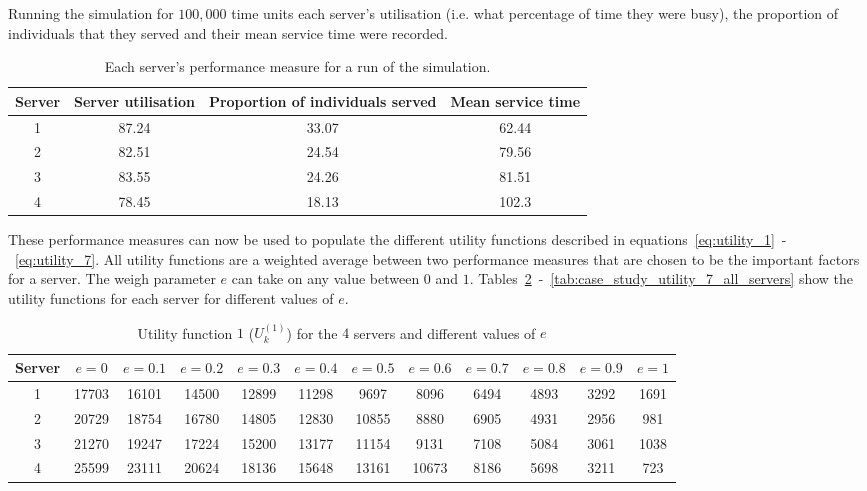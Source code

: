 Running the simulation for \(100,000\) time units each server's utilisation
(i.e. what percentage of time they were busy), the proportion of individuals
that they served and their mean service time were recorded.

\begin{table}[H]
    \caption{Each server's performance measure for a run of the simulation.}
    \label{tab:case_study_server_metrics}
    \begin{tabular}{|c|c|c|c|}
        \hline
        Server & Server utilisation & Proportion of individuals served &
        Mean service time \\
        \hline
        1 & 87.24 & 33.07 & 62.44 \\
        2 & 82.51 & 24.54 & 79.56 \\
        3 & 83.55 & 24.26 & 81.51 \\
        4 & 78.45 & 18.13 & 102.3 \\
        \hline
    \end{tabular}
\end{table}

These performance measures can now be used to populate the different utility
functions described in equations~\eqref{eq:utility_1}~-~\eqref{eq:utility_7}.
All utility functions are a weighted average between two performance measures
that are chosen to be the important factors for a server.
The weigh parameter \(e\) can take on any value between \(0\) and \(1\).
Tables~\ref{tab:case_study_utility_1_all_servers}~-~\ref{tab:case_study_utility_7_all_servers}
show the utility functions for each server for different values of \(e\).

\begin{table}[H]
    \caption{Utility function \(1\) (\(U_k^{(1)}\)) for the \(4\) servers and
    different values of \(e\)}
    \label{tab:case_study_utility_1_all_servers}
    \begin{adjustbox}{width=\columnwidth,center}
        \begin{tabular}{|c|c|c|c|c|c|c|c|c|c|c|c|}
            \hline
            Server & \(e = 0\) & \(e = 0.1\) & \(e = 0.2\) & \(e = 0.3\)
                   & \(e = 0.4\) & \(e = 0.5\) & \(e = 0.6\) & \(e = 0.7\)
                   & \(e = 0.8\) & \(e = 0.9\) & \(e = 1\) \\
            \hline
            1 & 17703 & 16101 &	14500 & 12899 & 11298 & 9697 & 8096 & 6494
                & 4893 & 3292 & 1691 \\
            2 & 20729 & 18754 &	16780 & 14805 & 12830 & 10855 & 8880 & 6905
                & 4931 & 2956 & 981 \\
            3 & 21270 & 19247 & 17224 & 15200 & 13177 & 11154 & 9131 & 7108
                & 5084 & 3061 & 1038 \\
            4 & 25599 & 23111 &	20624 & 18136 & 15648 & 13161 & 10673 & 8186
                & 5698 & 3211 & 723 \\
            \hline
        \end{tabular}
    \end{adjustbox}
\end{table}

